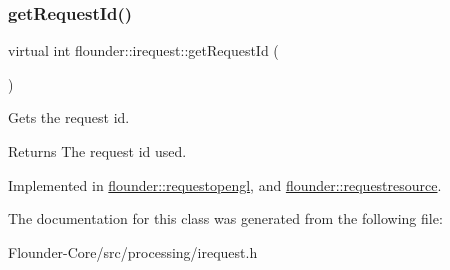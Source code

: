 \subsubsection{\texorpdfstring{get\+Request\+Id()}{getRequestId()}}
{\footnotesize\ttfamily virtual int flounder\+::irequest\+::get\+Request\+Id (\begin{DoxyParamCaption}{ }\end{DoxyParamCaption})\hspace{0.3cm}{\ttfamily [pure virtual]}}



Gets the request id. 

\begin{DoxyReturn}{Returns}
The request id used. 
\end{DoxyReturn}


Implemented in \hyperlink{classflounder_1_1requestopengl_a897fbd9310873f5a2972764b5d855409}{flounder\+::requestopengl}, and \hyperlink{classflounder_1_1requestresource_a4c46533325ddc35a1b89e4af418ea77e}{flounder\+::requestresource}.



The documentation for this class was generated from the following file\+:\begin{DoxyCompactItemize}
\item 
Flounder-\/\+Core/src/processing/irequest.\+h\end{DoxyCompactItemize}
